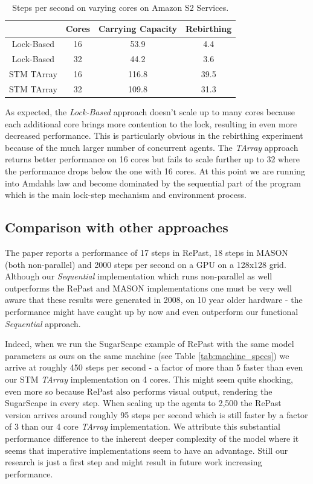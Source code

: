 \begin{table}
	\centering
  	\begin{tabular}{ c || c | c | c }
                   & Cores & Carrying Capacity & Rebirthing \\ \hline \hline 
    	Lock-Based & 16    & 53.9              & 4.4        \\ \hline
    	Lock-Based & 32    & 44.2              & 3.6        \\ \hline \hline 
   		
   		STM TArray & 16    & 116.8             & 39.5       \\ \hline
   		STM TArray & 32    & 109.8             & 31.3       \\ \hline
   	\end{tabular}
  	
  	\caption{Steps per second on varying cores on Amazon S2 Services.}
	\label{tab:sug_varying_cores_amazon}
\end{table}

As expected, the \textit{Lock-Based} approach doesn't scale up to many cores because each additional core brings more contention to the lock, resulting in even more decreased performance. This is particularly obvious in the rebirthing experiment because of the much larger number of concurrent agents. The \textit{TArray} approach returns better performance on 16 cores but fails to scale further up to 32 where the performance drops below the one with 16 cores. At this point we are running into Amdahls law and become dominated by the sequential part of the program which is the main lock-step mechanism and environment process.

\subsection{Comparison with other approaches}
The paper \cite{lysenko_framework_2008} reports a performance of 17 steps in RePast, 18 steps in MASON (both non-parallel) and 2000 steps per second on a GPU on a 128x128 grid. Although our \textit{Sequential} implementation which runs non-parallel as well outperforms the RePast and MASON implementations one must be very well aware that these results were generated in 2008, on 10 year older hardware - the performance might have caught up by now and even outperform our functional \textit{Sequential} approach. 

Indeed, when we run the SugarScape example of RePast with the same model parameters as ours on the same machine (see Table \ref{tab:machine_specs}) we arrive at roughly 450 steps per second - a factor of more than 5 faster than even our STM \textit{TArray} implementation on 4 cores. This might seem quite shocking, even more so because RePast also performs visual output, rendering the SugarScape in every step. When scaling up the agents to 2,500 the RePast version arrives around roughly 95 steps per second which is still faster by a factor of 3 than our 4 core \textit{TArray} implementation. We attribute this substantial performance difference to  the inherent deeper complexity of the model where it seems that imperative implementations seem to have an advantage. Still our research is just a first step and might result in future work increasing performance.

